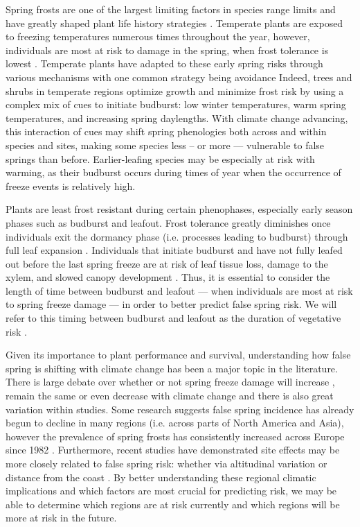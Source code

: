 \documentclass{article}\usepackage[]{graphicx}\usepackage[]{color}
\begin{document}
Spring frosts are one of the largest limiting factors in species range limits and have greatly shaped plant life history strategies \citep{Kollas2014}. Temperate plants are exposed to freezing temperatures numerous times throughout the year, however, individuals are most at risk to damage in the spring, when frost tolerance is lowest \citep{Sakai1987}. Temperate plants have adapted to these early spring risks through various mechanisms with one common strategy being avoidance \citep{Vitasse2014} %
Indeed, trees and shrubs in temperate regions optimize growth and minimize frost risk by using a complex mix of cues to initiate budburst: low winter temperatures, warm spring temperatures, and increasing spring daylengths. With climate change advancing, this interaction of cues may shift spring phenologies both across and within species and sites, making some species less -- or more --- vulnerable to false springs than before. Earlier-leafing species may be especially at risk with warming, as their budburst occurs during times of year when the occurrence of freeze events is relatively high.
 
Plants are least frost resistant during certain phenophases, especially early season phases such as budburst and leafout. Frost tolerance greatly diminishes once individuals exit the dormancy phase (i.e. processes leading to budburst) through full leaf expansion \citep{Lenz2016, Vitasse2014}. Individuals that initiate budburst and have not fully leafed out before the last spring freeze are at risk of leaf tissue loss, damage to the xylem, and slowed canopy development \citep{Gu2008, Hufkens2012}. Thus, it is essential to consider the length of time between budburst and leafout --- when individuals are most at risk to spring freeze damage \citep{Lenz2016} --- in order to better predict false spring risk. We will refer to this timing between budburst and leafout as the duration of vegetative risk \citep{Chamberlain2019}.

Given its importance to plant performance and survival, understanding how false spring is shifting with climate change has been a major topic in the literature. There is large debate over whether or not spring freeze damage will increase \citep{Augspurger2013, Hannenin1991, Labe2016}, remain the same \citep{Scheifinger2003} or even decrease \citep{Kramer1994, Vitra2017} with climate change and there is also great variation within studies. Some research suggests false spring incidence has already begun to decline in many regions (i.e. across parts of North America and Asia), however the prevalence of spring frosts has consistently increased across Europe since 1982 \citep{Liu2018}. Furthermore, recent studies have demonstrated site effects may be more closely related to false spring risk: whether via altitudinal variation \citep{Ma2018, Vitasse2018, Vitra2017} or distance from the coast \citep{ Ma2018, Wypych2016a}. By better understanding these regional climatic implications and which factors are most crucial for predicting risk, we may be able to determine which regions are at risk currently and which regions will be more at risk in the future.
\end{document}
